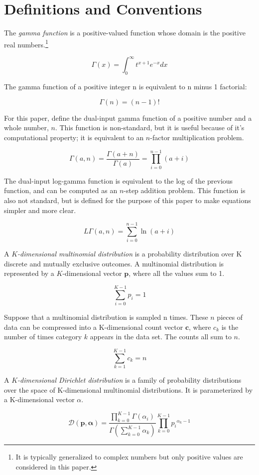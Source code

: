 \documentclass[twoside]{article}
\begin{document}
\section{Definitions and Conventions}

The \textit{gamma function} is a positive-valued function whose domain is the positive real numbers.\footnote{It is typically generalized to complex numbers but only positive values are considered in this paper.}

\[\Gamma(x)=\int_0^\infty t^{x+1}e^{-x}dx\]

The gamma function of a positive integer n is equivalent to n minus 1 factorial:

\[\Gamma(n)=(n-1)!\]

For this paper, define the dual-input gamma function of a positive number and a whole number, \(n\).  This function is non-standard, but it is useful because of it’s computational property; it is equivalent to an \(n\)-factor multiplication problem.

\[\Gamma(a,n)=\frac{\Gamma(a+n)}{\Gamma(a)}=\prod_{i=0}^{n-1}(a+i)\]

The dual-input log-gamma function is equivalent to the log of the previous function, and can be computed as an \(n\)-step addition problem. This function is also not standard, but is defined for the purpose of this paper to make equations simpler and more clear.

\[L\Gamma(a,n)=\sum_{i=0}^{n-1}\ln(a+i)\]

A \textit{\(K\)-dimensional multinomial distribution} is a probability distribution over K discrete and mutually exclusive outcomes.  A multinomial distribution is represented by a \(K\)-dimensional vector $\mathbf{p}$, where all the values sum to 1.

\[\sum_{i=0}^{K-1}p_i=1\]

Suppose that a multinomial distribution is sampled n times.  These \(n\) pieces of data can be compressed into a K-dimensional count vector \(\mathbf{c}\), where \(c_k\) is the number of times category \(k\) appears in the data set.  The counts all sum to $n$.

\[\sum_{k=1}^{K-1}c_k=n\]

A \textit{\(K\)-dimensional Dirichlet distribution} is a family of probability distributions over the space of K-dimensional multinomial distributions.  It is parameterized by a K-dimensional vector $\alpha$.

\[\mathcal{D}(\mathbf{p},\mathbf{\alpha})=\frac{\prod_{k=0}^{K-1}\Gamma(\alpha_i)}{\Gamma\left(\sum_{k=0}^{K-1}\alpha_k\right)}\prod_{k=0}^{K-1}{p_i}^{\alpha_k-1}\]
\end{document}
